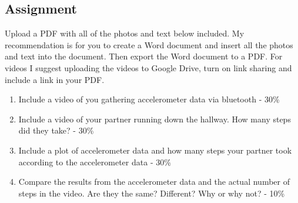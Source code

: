 \subsection{Assignment}

Upload a PDF with all of the photos and text below included. My recommendation is for you to create a Word document and insert all the photos and text into the document. Then export the Word document to a PDF. For videos I suggest uploading the videos to Google Drive, turn on link sharing and include a link in your PDF.

\begin{enumerate}[itemsep=-5pt]
\item Include a video of you gathering accelerometer data via bluetooth - 30\%
\item Include a video of your partner running down the hallway. How many steps did they take? - 30\%
\item Include a plot of accelerometer data and how many steps your partner took according to the accelerometer data - 30\%
\item Compare the results from the accelerometer data and the actual number of steps in the video. Are they the same? Different? Why or why not? - 10\%
\end{enumerate}
